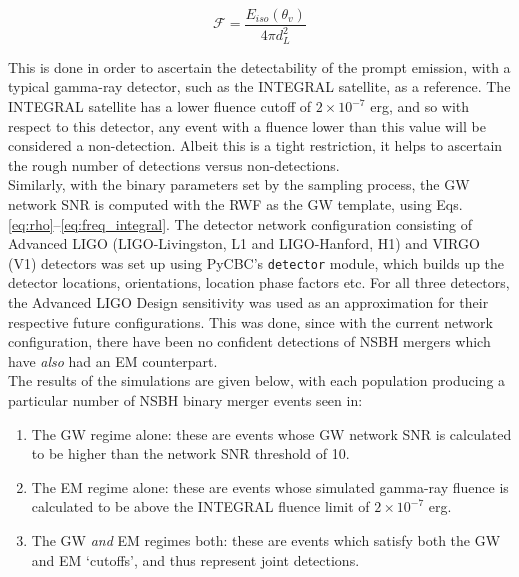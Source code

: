     \begin{equation}
        \mathcal{F} = \dfrac{E_{iso}(\theta_v)}{4\pi d_L^2}
    \end{equation}

    This is done in order to ascertain the detectability of the prompt emission, with a
    typical gamma-ray detector, such as the INTEGRAL satellite, as a reference. The
    INTEGRAL satellite has a lower fluence cutoff of $2 \times 10^{-7}$ erg, and so with
    respect to this detector, any event with a fluence lower than this value will be
    considered a non-detection. Albeit this is a tight restriction, it helps to
    ascertain the rough number of detections versus non-detections.\\
    Similarly, with the binary parameters set by the sampling process, the GW network
    SNR is computed with the RWF as the GW template, using
    Eqs.\ref{eq:rho}--\ref{eq:freq_integral}. The detector network configuration
    consisting of Advanced LIGO (LIGO-Livingston, L1 and LIGO-Hanford, H1) and
    VIRGO (V1) detectors was set up using PyCBC's \texttt{detector} module, which builds
    up the detector locations, orientations, location phase factors etc. For all three
    detectors, the Advanced LIGO Design sensitivity was used as an approximation for
    their respective future configurations. This was done, since with the current
    network configuration, there have been no confident detections of NSBH mergers which
    have \textit{also} had an EM counterpart.\\
    The results of the simulations are given below, with each population producing a
    particular number of NSBH binary merger events seen in:

    \begin{enumerate}

        \item The GW regime alone: these are events whose GW network SNR is calculated
            to be higher than the network SNR threshold of 10.

        \item The EM regime alone: these are events whose simulated gamma-ray fluence
            is calculated to be above the INTEGRAL fluence limit of $2 \times 10^{-7}$
            erg.

        \item The GW \textit{and} EM regimes both: these are events which satisfy both
            the GW and EM `cutoffs', and thus represent joint detections.

    \end{enumerate}

